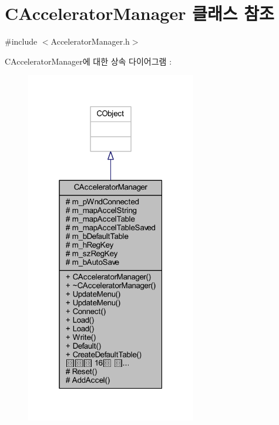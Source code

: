 \hypertarget{class_c_accelerator_manager}{}\section{C\+Accelerator\+Manager 클래스 참조}
\label{class_c_accelerator_manager}


{\ttfamily \#include $<$Accelerator\+Manager.\+h$>$}



C\+Accelerator\+Manager에 대한 상속 다이어그램 \+: \nopagebreak
\begin{figure}[H]
\begin{center}
\leavevmode
\includegraphics[width=211pt]{class_c_accelerator_manager__inherit__graph}
\end{center}
\end{figure}


